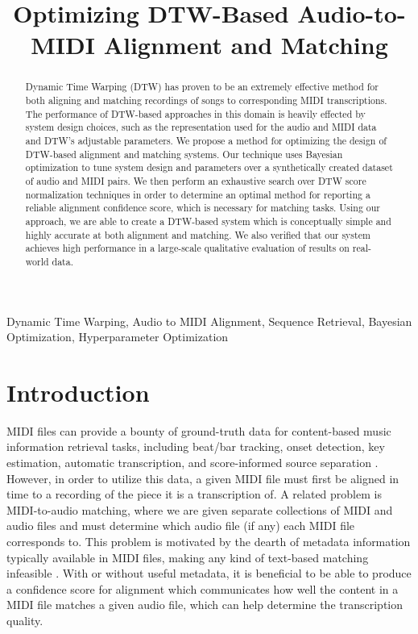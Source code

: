 \documentclass{article}
\title{Optimizing DTW-Based Audio-to-MIDI Alignment and Matching}
\begin{document}
\ninept
\maketitle

\begin{abstract}
Dynamic Time Warping (DTW) has proven to be an extremely effective method for both aligning and matching recordings of songs to corresponding MIDI transcriptions.
The performance of DTW-based approaches in this domain is heavily effected by system design choices, such as the representation used for the audio and MIDI data and DTW's adjustable parameters.
We propose a method for optimizing the design of DTW-based alignment and matching systems.
Our technique uses Bayesian optimization to tune system design and parameters over a synthetically created dataset of audio and MIDI pairs.
We then perform an exhaustive search over DTW score normalization techniques in order to determine an optimal method for reporting a reliable alignment confidence score, which is necessary for matching tasks.
Using our approach, we are able to create a DTW-based system which is conceptually simple and highly accurate at both alignment and matching.
We also verified that our system achieves high performance in a large-scale qualitative evaluation of results on real-world data.
\end{abstract}

\begin{keywords}
Dynamic Time Warping, Audio to MIDI Alignment, Sequence Retrieval, Bayesian Optimization, Hyperparameter Optimization
\end{keywords}

\section{Introduction}
\label{sec:intro}

MIDI files can provide a bounty of ground-truth data for content-based music information retrieval tasks, including beat/bar tracking, onset detection, key estimation, automatic transcription, and score-informed source separation \cite{ewert2012towards, turetsky2003ground, ewert2014score, raffel2014pretty_midi}.
However, in order to utilize this data, a given MIDI file must first be aligned in time to a recording of the piece it is a transcription of.
A related problem is MIDI-to-audio matching, where we are given separate collections of MIDI and audio files and must determine which audio file (if any) each MIDI file corresponds to.
This problem is motivated by the dearth of metadata information typically available in MIDI files, making any kind of text-based matching infeasible \cite{raffel2015large}.
With or without useful metadata, it is beneficial to be able to produce a confidence score for alignment which communicates how well the content in a MIDI file matches a given audio file, which can help determine the transcription quality.
\end{document}
